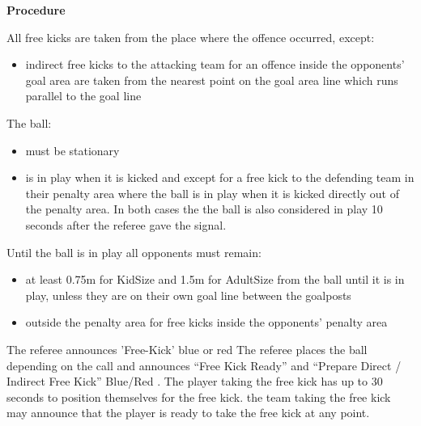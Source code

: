 {\bfseries Procedure}

\headlinebox

All free kicks are taken from the place where the offence occurred, except:
\begin{itemize}
\item indirect free kicks to the attacking team for an offence inside the opponents' goal area are taken from the nearest point on the goal area line which runs parallel to the goal line
\end{itemize}

The ball:
\begin{itemize}
\item must be stationary 
\item is in play when it is kicked and   except for a free kick to the defending team in their penalty area
      where the ball is in play when it is kicked directly out of the penalty area.
      In both cases the the ball is also considered in play 10 seconds
      after the referee gave the signal.
\end{itemize}

Until the ball is in play all opponents must remain:
\begin{itemize}
\item at least 0.75m for KidSize and 1.5m for AdultSize
       from the ball until it is in play,
      unless they are on their own goal line between the goalposts 
\item outside the penalty area for free kicks inside the opponents' penalty area
\end{itemize}

The referee announces 'Free-Kick' blue or
red%
The referee places the ball depending on the call and announces
``Free Kick Ready'' and 
``Prepare Direct / Indirect Free Kick'' Blue/Red .
The player taking the free kick has up to 30 seconds to position themselves for
the free kick.
 the team taking the free kick may announce that the player is ready to take the
free kick at any point.

